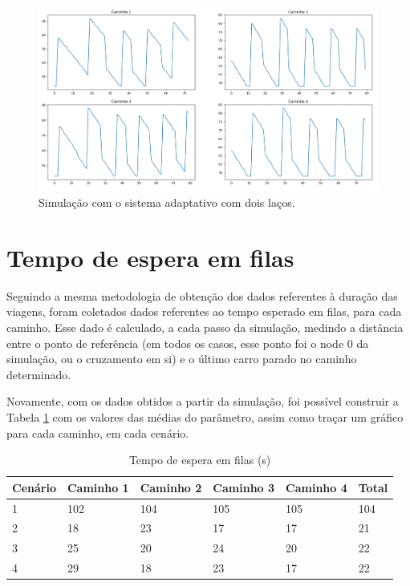 \begin{figure}[H]
    \begin{center}
    \includegraphics[width=1\textwidth]{figuras/Trip_Duration_With_Two_Loop.PNG}
    \end{center}
    \caption[Duração da viagem, cenário 4]{Simulação com o sistema adaptativo com dois laços.}
    \label{tripTwoLoop}
\end{figure}

\section{Tempo de espera em filas}
Seguindo a mesma metodologia de obtenção dos dados referentes à duração das viagens, foram coletados dados referentes ao tempo esperado em filas, para cada caminho. Esse dado é calculado, a cada passo da simulação, medindo a distância entre o ponto de referência (em todos os casos, esse ponto foi o node 0 da simulação, ou o cruzamento em si) e o último carro parado no caminho determinado.

Novamente, com os dados obtidos a partir da simulação, foi possível construir a Tabela \ref{tab: queue} com os valores das médias do parâmetro, assim como traçar um gráfico para cada caminho, em cada cenário.

\begin{table}[H]
\centering
\caption{Tempo de espera em filas (s)}
\label{tab: queue}
\begin{tabular}{@{}llllll@{}}
\toprule
Cenário & Caminho 1 & Caminho 2 & Caminho 3 & Caminho 4 & Total \\ \midrule
1 & 102 & 104 & 105 & 105 & 104 \\
2 & 18 & 23 & 17 & 17 & 21 \\
3 &	25 & 20 & 24 & 20 & 22 \\
4 & 29 & 18 & 23 & 17 & 22 \\
\bottomrule
\end{tabular}
\end{table}

